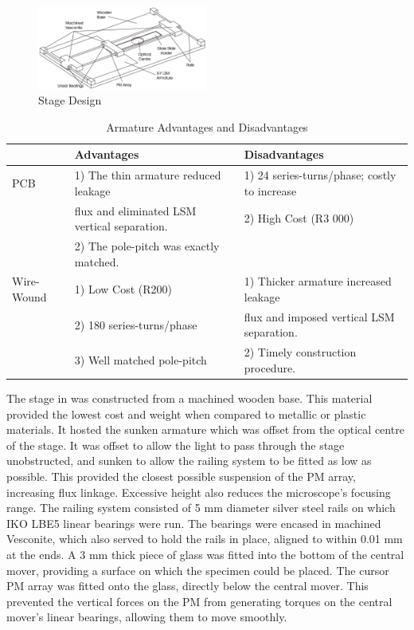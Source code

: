 \documentclass[10pt,twocolumn]{witseiepaper}
\begin{document}
\begin{figure}[hb!]
	\centering
		\includegraphics[width=0.50\textwidth]{../../Drawings/Stage-Final.pdf}
	\caption{Stage Design}
	\label{fig:Stage}
\end{figure}
\begin{table}[ht!]
	\centering
	\caption{Armature Advantages and Disadvantages}
		\begin{tabular}{lll}
			\hline
													&	{\msbf Advantages} 						& {\msbf Disadvantages}\\
			\hline
			{\msbf PCB}					& 1) The thin armature reduced leakage  			& 1) 24 series-turns/phase; costly to increase\\
													& flux and eliminated LSM vertical separation.& 2) High Cost (R3 000)\\
													& 2) The pole-pitch was exactly matched.\\													
			\hline
			{\msbf Wire-Wound}	& 1) Low Cost (R200)										& 1) Thicker armature increased leakage\\ 
													& 2) 180 series-turns/phase			& flux and imposed vertical LSM separation.\\
													& 3) Well matched pole-pitch  	& 2) Timely construction procedure.\\						\hline
		\end{tabular}
	\label{tab:Armatures}
\end{table}
The stage in  was constructed from a machined wooden base.
This material provided the lowest cost and weight when compared to metallic or
plastic materials.  It hosted the sunken armature which was offset from the
optical centre of the stage.  It was offset to allow the light to pass through
the stage unobstructed, and sunken to allow the railing system to be fitted as
low as possible.  This provided the closest possible suspension of the PM
array, increasing flux linkage.  Excessive height also reduces the
microscope's focusing range.  The railing system consisted of 5 mm diameter
silver steel rails on which IKO LBE5 linear bearings were run.  The bearings
were encased in machined Vesconite, which also served to hold the rails in
place, aligned to within 0.01 mm at the ends.  A 3 mm thick piece of glass was
fitted into the bottom of the central mover, providing a surface on which the
specimen could be placed.  The cursor PM array was fitted onto the glass,
directly below the central mover.  This prevented the vertical forces on the
PM from generating torques on the central mover's linear bearings, allowing
them to move smoothly. 
\end{document}
